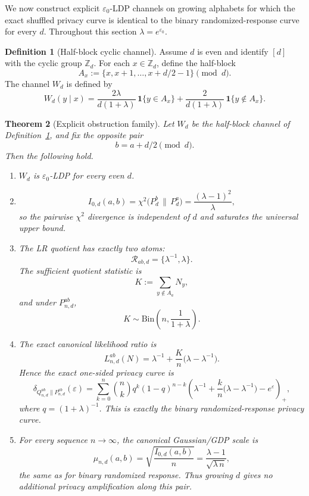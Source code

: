 \documentclass[11pt]{amsart}
\numberwithin{equation}{section}
\newtheorem{theorem}{Theorem}[section]
\theoremstyle{definition}
\newtheorem{definition}[theorem]{Definition}
\newcommand{\one}{\mathbf 1}
\newcommand{\Bin}{\mathrm{Bin}}
\begin{document}
We now construct explicit $\varepsilon_0$-LDP channels on growing alphabets for which the exact shuffled
privacy curve is identical to the binary randomized-response curve for every $d$.
Throughout this section $\lambda=e^{\varepsilon_0}$.

\begin{definition}[Half-block cyclic channel]\label{def:half-block}
Assume $d$ is even and identify $[d]$ with the cyclic group $\mathbb Z_d$.
For each $x\in\mathbb Z_d$, define the half-block
\[
A_x:=\{x,x+1,\dots,x+d/2-1\}\pmod d.
\]
The channel $W_d$ is defined by
\[
W_d(y\mid x)
=
\frac{2\lambda}{d(1+\lambda)}\,\one\{y\in A_x\}
+
\frac{2}{d(1+\lambda)}\,\one\{y\notin A_x\}. \tag{5.1}\label{eq:half-block}
\]
\end{definition}

\begin{theorem}[Explicit obstruction family]\label{thm:half-block}
Let $W_d$ be the half-block channel of Definition~\ref{def:half-block}, and fix the opposite pair
\[
b=a+d/2 \pmod d.
\]
Then the following hold.

\begin{enumerate}
\item $W_d$ is $\varepsilon_0$-LDP for every even $d$.
\item
\[
I_{0,d}(a,b)=\chi^2\!\bigl(P_d^b\,\|\,P_d^a\bigr)=\frac{(\lambda-1)^2}{\lambda}, \tag{5.2}\label{eq:halfblock-chi}
\]
so the pairwise $\chi^2$ divergence is independent of $d$ and saturates the universal upper bound.
\item The LR quotient has exactly two atoms:
\[
\mathcal R_{ab,d}=\{\lambda^{-1},\lambda\}.
\]
The sufficient quotient statistic is
\[
K:=\sum_{y\notin A_a}N_y,
\]
and under $P_{n,d}^{ab}$,
\[
K\sim \Bin\!\left(n,\frac{1}{1+\lambda}\right). \tag{5.3}\label{eq:K-bin}
\]
\item The exact canonical likelihood ratio is
\[
L_{n,d}^{ab}(N)
=
\lambda^{-1}+\frac{K}{n}\bigl(\lambda-\lambda^{-1}\bigr). \tag{5.4}\label{eq:halfblock-LR}
\]
Hence the exact one-sided privacy curve is
\[
\delta_{Q_{n,d}^{ab}\|P_{n,d}^{ab}}(\varepsilon)
=
\sum_{k=0}^n \binom{n}{k} q^k(1-q)^{n-k}
\left(\lambda^{-1}+\frac{k}{n}\bigl(\lambda-\lambda^{-1}\bigr)-e^\varepsilon\right)_+, \tag{5.5}\label{eq:halfblock-delta}
\]
where \( q=(1+\lambda)^{-1} \).
This is exactly the binary randomized-response privacy curve.
\item For every sequence $n\to\infty$,
the canonical Gaussian/GDP scale is
\[
\mu_{n,d}(a,b)=\sqrt{\frac{I_{0,d}(a,b)}{n}}
=\frac{\lambda-1}{\sqrt{\lambda\,n}}, \tag{5.6}\label{eq:halfblock-mu}
\]
the same as for binary randomized response.
Thus growing $d$ gives no additional privacy amplification along this pair.
\end{enumerate}
\end{theorem}
\end{document}
